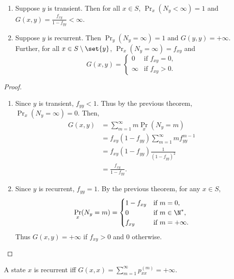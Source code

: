 \begin{theorem} \leavevmode
    \begin{enumerate}[label=(\arabic*)]
        \item Suppose $y$ is transient.
        Then for all $x \in S$, $\Pr_x(N_y < \infty) = 1$ and
        $G(x, y) = \frac{f_{xy}}{1 - f_{yy}} < \infty$.
        \item Suppose $y$ is recurrent.
        Then $\Pr_y(N_y = \infty) = 1$ and $G(y, y) = +\infty$.
        Further, for all $x \in S \setminus \set{y}$,
        $\Pr_x(N_y = \infty) = f_{xy}$ and \[
            G(x, y) = \begin{cases}
                0 & \text{if } f_{xy} = 0, \\
                \infty & \text{if } f_{xy} > 0.
            \end{cases}
        \]
    \end{enumerate}
\end{theorem}
\begin{proof} \leavevmode
    \begin{enumerate}[label=(\arabic*)]
        \item Since $y$ is transient, $f_{yy} < 1$.
        Thus by the previous theorem, $\Pr_x(N_y = \infty) = 0$.
        Then, \begin{align*}
            G(x, y) &= \sum_{m=1}^{\infty} m \Pr_x(N_y = m) \\
                    &= f_{xy} (1 - f_{yy})
                        \sum_{m=1}^{\infty} m f_{yy}^{m-1} \\
                    &= f_{xy} (1 - f_{yy}) \frac{1}{(1 - f_{yy})^2} \\
                    &= \frac{f_{xy}}{1 - f_{yy}}.
        \end{align*}
        \item Since $y$ is recurrent, $f_{yy} = 1$.
        By the previous theorem, for any $x \in S$, \[
            \Pr_x(N_y = m) = \begin{cases}
                1 - f_{xy} & \text{if } m = 0, \\
                0 & \text{if } m \in \N^*, \\
                f_{xy} & \text{if } m = +\infty.
            \end{cases}
        \] Thus $G(x, y) = +\infty$ if $f_{xy} > 0$ and $0$ otherwise.
        \qedhere
    \end{enumerate}
\end{proof}
\begin{corollary}
    A state $x$ is recurrent iff
    $G(x, x) = \sum_{m=1}^{\infty} p_{xx}^{(m)} = +\infty$.
\end{corollary}

